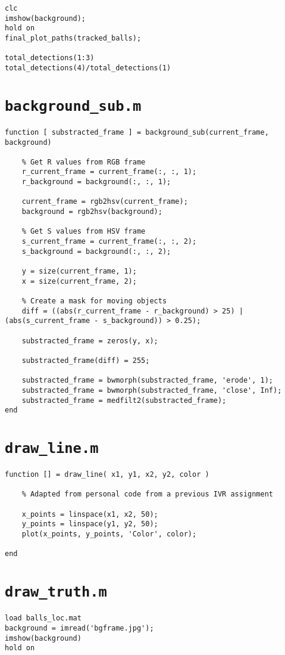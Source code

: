 \documentclass[12pt,a4paper]{article}
\begin{document}
\begin{appendices}
\begin{verbatim}
clc
imshow(background);
hold on
final_plot_paths(tracked_balls);

total_detections(1:3)
total_detections(4)/total_detections(1)
\end{verbatim}

\chapter{\texttt{background\_sub.m}}
\begin{verbatim}
function [ substracted_frame ] = background_sub(current_frame, background)

    % Get R values from RGB frame
    r_current_frame = current_frame(:, :, 1);
    r_background = background(:, :, 1);
    
    current_frame = rgb2hsv(current_frame);
    background = rgb2hsv(background);
    
    % Get S values from HSV frame
    s_current_frame = current_frame(:, :, 2);
    s_background = background(:, :, 2);
    
    y = size(current_frame, 1);
    x = size(current_frame, 2);
    
    % Create a mask for moving objects
    diff = ((abs(r_current_frame - r_background) > 25) | (abs(s_current_frame - s_background)) > 0.25);
    
    substracted_frame = zeros(y, x);
    
    substracted_frame(diff) = 255;
    
    substracted_frame = bwmorph(substracted_frame, 'erode', 1);
    substracted_frame = bwmorph(substracted_frame, 'close', Inf);
    substracted_frame = medfilt2(substracted_frame);
end
\end{verbatim}

\chapter{\texttt{draw\_line.m}}
\begin{verbatim}
function [] = draw_line( x1, y1, x2, y2, color )

    % Adapted from personal code from a previous IVR assignment
	
    x_points = linspace(x1, x2, 50);  
    y_points = linspace(y1, y2, 50); 
    plot(x_points, y_points, 'Color', color);
    
end
\end{verbatim}

\chapter{\texttt{draw\_truth.m}}
\begin{verbatim}
load balls_loc.mat
background = imread('bgframe.jpg');
imshow(background)
hold on


\end{verbatim}
\end{appendices}
\end{document}
